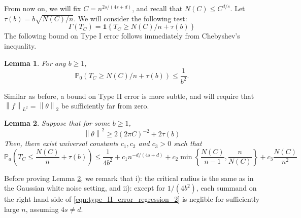 \documentclass{article}
\newcommand{\norm}[1]{\left\lVert#1\right\rVert}
\newcommand{\set}[1]{\left\{#1\right\}}
\newcommand{\1}{\mathbb{I}}
\newcommand{\Pbb}{\mathbb{P}}
\theoremstyle{alden}
\theoremstyle{aldenthm}
\newtheorem{lemma}{Lemma}
\theoremstyle{definition}
\theoremstyle{remark}
\begin{document}
From now on, we will fix $C = n^{2s/(4s + d)}$, and recall that $N(C) \leq C^{d/s}$. Let $\tau(b) = b \sqrt{N(C)/n}$. We will consider the following test:
\begin{equation*}
\Gamma(T_C) = \mathbf{1}\set{T_C \geq N(C)/n + \tau(b)}
\end{equation*}
The following bound on Type I error follows immediately from Chebyshev's inequality.
\begin{lemma}
	For any $b \geq 1$,
	\begin{equation*}
	\Pbb_0(T_C \geq N(C)/n + \tau(b)) \leq \frac{1}{b^2}.
	\end{equation*}
\end{lemma}
Similar as before, a bound on Type II error is more subtle, and will require that $\norm{f}_{L^2} = \norm{\theta}_2$ be sufficiently far from zero.
\begin{lemma}
	\label{lem:type_II_error_regression}
	Suppose that for some $b \geq 1$, 
	\begin{equation}
	\label{eqn:type_II_error_regression_1}
	\norm{\theta}^2 \geq 2(2\pi C)^{-2} + 2\tau(b)
	\end{equation}
	Then, there exist universal constants $c_1, c_2$ and $c_3 > 0$ such that
	\begin{equation}
	\label{eqn:type_II_error_regression_2}
	\Pbb_a\left(T_C \leq \frac{N(C)}{n} + \tau(b) \right) \leq \frac{1}{4b^2} +  c_1 n^{-d/(4s + d)} + c_2 \min\set{\frac{N(C)}{n - 1},\frac{n}{N(C)}} + c_3 \frac{N(C)}{n^2}
	\end{equation}
\end{lemma}
Before proving Lemma \ref{lem:type_II_error_regression}, we remark that i): the critical radius is the same as in the Gaussian white noise setting, and ii): except for $1/(4b^2)$, each summand on the right hand side of \eqref{eqn:type_II_error_regression_2} is neglible for sufficiently large $n$, assuming $4s \neq d$. 
\end{document}
